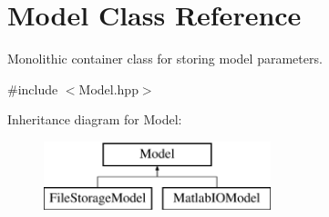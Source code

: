 \hypertarget{class_model}{\section{Model Class Reference}
\label{class_model}
}


Monolithic container class for storing model parameters.  




{\ttfamily \#include $<$Model.\-hpp$>$}

Inheritance diagram for Model\-:\begin{figure}[H]
\begin{center}
\leavevmode
\includegraphics[height=2.000000cm]{class_model}
\end{center}
\end{figure}
